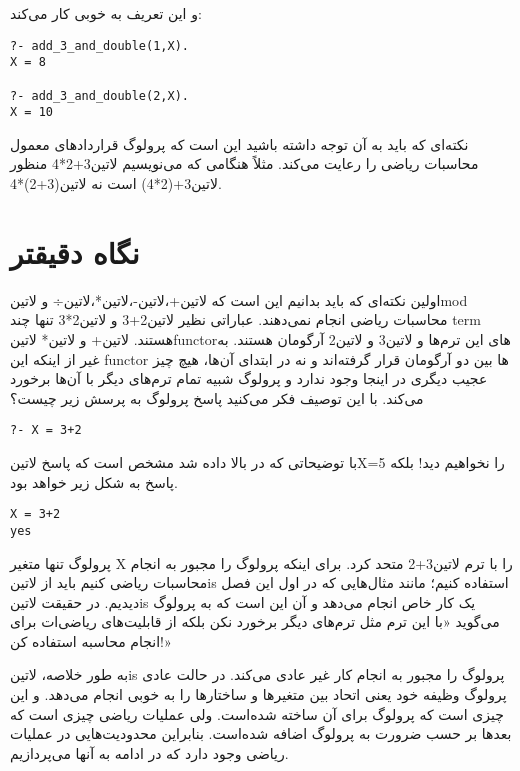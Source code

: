 و این تعریف به خوبی کار می‌کند:

\begin{latin}
\begin{lstlisting}
?- add_3_and_double(1,X).
X = 8

?- add_3_and_double(2,X).
X = 10
\end{lstlisting}
\end{latin}

نکته‌ای که باید به آن توجه داشته باشید این است که پرولوگ قراردادهای معمول محاسبات ریاضی را رعایت می‌کند. مثلاً هنگامی که می‌نویسیم ‌لاتین{3+2*4} منظور ‌لاتین{3+(2*4)} است نه ‌لاتین{(3+2)*4}.

\section{نگاه دقیقتر}
اولین نکته‌ای که باید بدانیم این است که ‌لاتین{+}،‌لاتین{-}،‌لاتین{*}،‌لاتین{÷} و ‌لاتین{mod} محاسبات ریاضی انجام نمی‌دهند. عباراتی نظیر ‌لاتین{2+3} و ‌لاتین{2*3} تنها چند term هستند. ‌لاتین{+} و ‌لاتین{*} ‌لاتین{functor‌}های این ترم‌ها و ‌لاتین{3} و ‌لاتین{2} آرگومان هستند. به غیر از اینکه این functor ها بین دو آرگومان قرار گرفته‌اند و نه در ابتدای آن‌ها، هیچ چیز عجیب دیگری در اینجا وجود ندارد و پرولوگ شبیه تمام ترم‌های دیگر با آن‌ها برخورد می‌کند. با این توصیف فکر می‌کنید پاسخ پرولوگ به پرسش زیر چیست؟

\begin{latin}
\begin{lstlisting}
?- X = 3+2
\end{lstlisting}
\end{latin}

با توضیحاتی که در بالا داده شد مشخص است که پاسخ ‌لاتین{X=5} را نخواهیم دید! بلکه پاسخ به شکل زیر خواهد بود.

\begin{latin}
\begin{lstlisting}
X = 3+2
yes
\end{lstlisting}
\end{latin}

پرولوگ تنها متغیر X را با ترم ‌لاتین{3+2} متحد کرد. برای اینکه پرولوگ را مجبور به انجام محاسبات ریاضی کنیم باید از ‌لاتین{is} استفاده کنیم؛ مانند مثال‌هایی که در اول این فصل دیدیم. در حقیقت ‌لاتین{is} یک کار خاص انجام می‌دهد و آن این است که به پرولوگ می‌گوید «با این ترم مثل ترم‌های دیگر برخورد نکن بلکه از قابلیت‌های ریاضی‌ات برای انجام محاسبه استفاده کن!»

به طور خلاصه، ‌لاتین{is} پرولوگ را مجبور به انجام کار غیر عادی می‌کند. در حالت عادی پرولوگ وظیفه خود یعنی اتحاد بین متغیرها و ساختارها را به خوبی انجام می‌دهد. و این چیزی است که پرولوگ برای آن ساخته شده‌است. ولی عملیات ریاضی چیزی است که بعدها بر حسب ضرورت به پرولوگ اضافه شده‌است. بنابراین محدودیت‌هایی در عملیات ریاضی وجود دارد که در ادامه به آنها می‌پردازیم.

